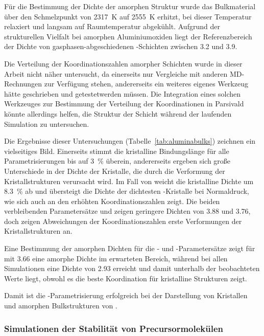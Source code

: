Für die Bestimmung der Dichte der amorphen Struktur wurde das Bulkmaterial über den Schmelzpunkt von \SI{2317}{\kelvin} auf \SI{2555}{\kelvin} erhitzt, bei dieser Temperatur relaxiert und langsam auf Raumtemperatur abgekühlt.
Aufgrund der strukturellen Vielfalt bei amorphen Aluminiumoxiden liegt der Referenzbereich der Dichte von gasphasen-abgeschiedenen -Schichten zwischen \SI{3.2}{\gpcc} und \SI{3.9}{\gpcc}\cite{wang_dependence_1997}.

Die Verteilung der Koordinationszahlen amorpher Schichten wurde in dieser Arbeit nicht näher untersucht, da einerseits nur Vergleiche mit anderen MD-Rechnungen zur Verfügung stehen\cite{gutierrez_molecular_2002}, andererseits ein weiteres eigenes Werkzeug hätte geschrieben und getestetwerden müssen.
Die Integration eines solchen Werkzeuges zur Bestimmung der Verteilung der Koordinationen in Parsivald könnte allerdings helfen, die Struktur der Schicht während der laufenden Simulation zu untersuchen.

Die Ergebnisse dieser Untersuchungen (Tabelle~\ref{tab:aluminabulks}) zeichnen ein vielseitiges Bild.
Einerseits stimmt die kristalline Bindungslänge für alle Parametrisierungen bis auf \SI{3}{\percent} überein, andererseits ergeben sich große Unterschiede in der Dichte der Kristalle, die durch die Verformung der Kristallstrukturen verursacht wird.
Im Fall von  weicht die kristalline Dichte um \SI{+8.3}{\percent} ab und übersteigt die Dichte der dichtesten -Kristalle bei Normaldruck, wie sich auch an den erhöhten Koordinationszahlen zeigt.
Die beiden verbleibenden Parametersätze  und  zeigen geringere Dichten von \SI{3.88}{\gpcc} und \SI{3.76}{\gpcc}, doch zeigen Abweichungen der Koordinationszahlen erste Verformungen der Kristallstrukturen an.

Eine Bestimmung der amorphen Dichten für die - und -Parametersätze zeigt für  mit \SI{3.66}{\gpcc} eine amorphe Dichte im erwarteten Bereich, während  bei allen Simulationen eine Dichte von \SI{2.93}{\gpcc} erreicht und damit unterhalb der beobachteten Werte liegt, obwohl es die beste Koordination für kristalline Strukturen zeigt.

Damit ist die -Parametrisierung erfolgreich bei der Darstellung von Kristallen und amorphen Bulkstrukturen von .

\subsubsection{Simulationen der Stabilität von Precursormolekülen}

